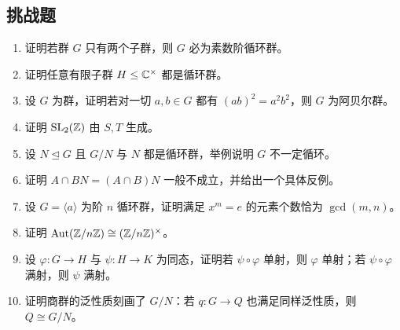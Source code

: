 \subsection*{挑战题}
\begin{enumerate}[resume, label=\textbf{\arabic*.}, leftmargin=*, itemsep=0.5em]
\item \hard 证明若群 $G$ 只有两个子群，则 $G$ 必为素数阶循环群。
\item \hard 证明任意有限子群 $H\le \mathbb{C}^\times$ 都是循环群。
\item \hard 设 $G$ 为群，证明若对一切 $a,b\in G$ 都有 $(ab)^2=a^2b^2$，则 $G$ 为阿贝尔群。
\item \hard 证明 $\mathrm{SL}_2(\mathbb{Z})$ 由 $S,T$ 生成。
\item \hard 设 $N\trianglelefteq G$ 且 $G/N$ 与 $N$ 都是循环群，举例说明 $G$ 不一定循环。
\item \hard 证明 $A\cap BN=(A\cap B)N$ 一般不成立，并给出一个具体反例。
\item \hard 设 $G=\langle a\rangle$ 为阶 $n$ 循环群，证明满足 $x^m=e$ 的元素个数恰为 $\gcd(m,n)$。
\item \hard 证明 $\mathrm{Aut}(\mathbb{Z}/n\mathbb{Z})\cong (\mathbb{Z}/n\mathbb{Z})^\times$。
\item \hard 设 $\varphi:G\to H$ 与 $\psi:H\to K$ 为同态，证明若 $\psi\circ\varphi$ 单射，则 $\varphi$ 单射；若 $\psi\circ\varphi$ 满射，则 $\psi$ 满射。
\item \hard 证明商群的泛性质刻画了 $G/N$：若 $q:G\to Q$ 也满足同样泛性质，则 $Q\cong G/N$。
\end{enumerate}
